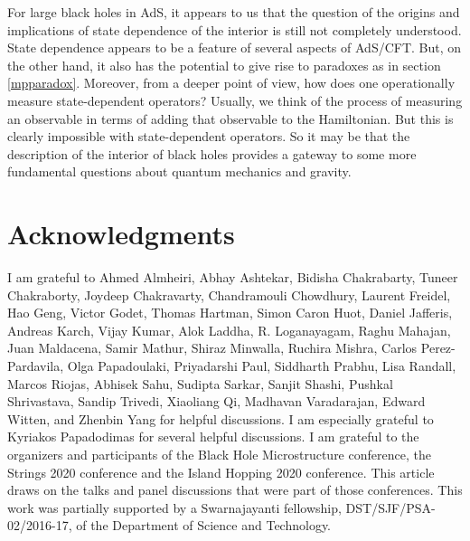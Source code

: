 \documentclass[12pt]{article}
\begin{document}
For large black holes in AdS, it appears to us that the question of 
the origins and implications of state dependence of the interior is
still not completely understood. State dependence
appears to be a feature of several aspects of AdS/CFT. But, on the other hand,
it also has the potential to give rise to paradoxes as in section \ref{mpparadox}. Moreover, from a deeper point of view, how does one operationally measure state-dependent operators? Usually, we think of the process of measuring an observable in 
terms of adding that observable to the Hamiltonian. But this is clearly impossible with state-dependent operators. So it may be that the description of the interior of black holes provides a gateway to some more fundamental questions about quantum mechanics and gravity.
































\section*{Acknowledgments}
I am grateful to  Ahmed Almheiri, Abhay Ashtekar, Bidisha Chakrabarty, Tuneer Chakraborty, Joydeep Chakravarty, Chandramouli Chowdhury, Laurent Freidel,  Hao Geng,  Victor Godet, Thomas Hartman,  Simon Caron Huot, Daniel Jafferis, Andreas Karch, Vijay Kumar, Alok Laddha, R. Loganayagam, Raghu Mahajan, Juan Maldacena, Samir Mathur, Shiraz Minwalla, Ruchira Mishra,  Carlos Perez-Pardavila, Olga Papadoulaki, Priyadarshi Paul, Siddharth Prabhu, Lisa Randall, Marcos Riojas, Abhisek Sahu, Sudipta Sarkar, Sanjit Shashi, Pushkal Shrivastava, Sandip Trivedi, Xiaoliang Qi,  Madhavan Varadarajan, Edward Witten, and Zhenbin Yang for helpful discussions. I am especially grateful to Kyriakos Papadodimas for several helpful discussions. I am grateful to the organizers and participants of the Black Hole Microstructure conference, the Strings 2020 conference and the Island Hopping 2020 conference. This article draws on the talks and panel discussions that were part of those conferences. This work was partially supported by a Swarnajayanti fellowship,  DST/SJF/PSA-02/2016-17, of the Department of Science and Technology. 
\end{document}
